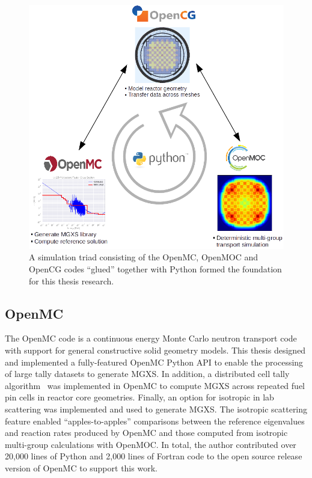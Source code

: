 \documentclass[12pt,twoside]{mitthesis-exec}
\begin{document}
\begin{figure}[h!]
  \centering
  \includegraphics[width=0.95\linewidth]{figures/workflow/triad/simulation-triad}
\caption[A simulation triad of OpenMC, OpenMOC and OpenCG]{A simulation triad consisting of the OpenMC, OpenMOC and OpenCG codes ``glued'' together with Python formed the foundation for this thesis research.}
\label{fig:simulation-triad}
\end{figure}

\subsection*{OpenMC}

The OpenMC code is a continuous energy Monte Carlo neutron transport code~\cite{romano2013openmc} with support for general constructive solid geometry models. This thesis designed and implemented a fully-featured OpenMC Python API to enable the processing of large tally datasets to generate MGXS. In addition, a distributed cell tally algorithm~\cite{lax2014distribcell} was implemented in OpenMC to compute MGXS across repeated fuel pin cells in reactor core geometries. Finally, an option for isotropic in lab scattering was implemented and used to generate MGXS. The isotropic scattering feature enabled ``apples-to-apples'' comparisons between the reference eigenvalues and reaction rates produced by OpenMC and those computed from isotropic multi-group calculations with OpenMOC. In total, the author contributed over 20,000 lines of Python and 2,000 lines of Fortran code to the open source release version of OpenMC to support this work.
\end{document}
